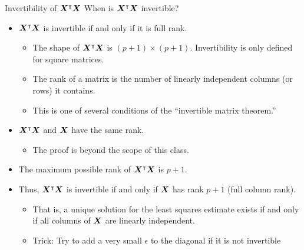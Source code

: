 \documentclass[aspectratio=169]{../latex_main/tntbeamer}  %
\begin{document}
	
	\begin{frame}{Invertibility of  $\bm{X}^\intercal\bm{X}$ }
	    When is $\bm{X}^\intercal\bm{X}$ invertible?
	    \begin{itemize}
	        \item $\bm{X}^\intercal\bm{X}$ is invertible if and only if it is full rank.
	        \begin{itemize}
	            \item The shape of    $\bm{X}^\intercal\bm{X}$ is $(p + 1) \times (p + 1)$. Invertibility is only defined for square matrices.
	            \item The rank of a matrix is the number of linearly independent columns (or rows) it contains.
	            \item This is one of several conditions of the “invertible matrix theorem.”
	        \end{itemize}
	        \item   $\bm{X}^\intercal\bm{X}$ and $\bm{X}$ have the same rank.
	        \begin{itemize}
	            \item The proof is beyond the scope of this class.
	        \end{itemize}
	        \item The maximum possible rank of   $\bm{X}^\intercal\bm{X}$  is $p + 1$.
	        \item Thus, $\bm{X}^\intercal\bm{X}$   is invertible if and only if $\bm{X}$ has rank $p + 1$ (full column rank). 
            \begin{itemize}
                \item That is, a unique solution for the least squares estimate exists if and only if all columns of $\bm{X}$ are linearly independent.
                \item \alert{Trick}: Try to add a very small $\epsilon$ to the diagonal if it is not invertible
            \end{itemize}
	    \end{itemize}
	\end{frame}
	
\end{document}
